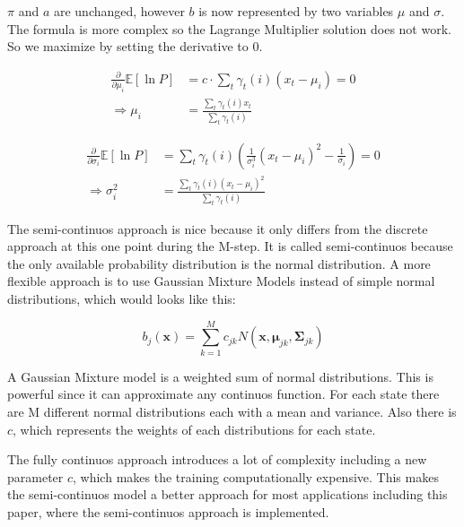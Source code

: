 $\pi$ and $a$ are unchanged, however $b$ is now represented by two variables $\mu$ and $\sigma$. The formula is more complex so the Lagrange Multiplier solution does not work. So we maximize by setting the derivative to 0. 

\begin{equation}
\begin{aligned}
\frac{\partial}{\partial \mu_i} \mathbb{E}[\ln P] &= c \cdot \sum_t \gamma_t(i) (x_t - \mu_i) = 0 \\
\Rightarrow \mu_i &= \frac{\sum_t \gamma_t(i)x_t}{\sum_t \gamma_t(i)}
\end{aligned}
\label{eq:mu-def}
\end{equation}

\begin{equation}
\begin{aligned}
\frac{\partial}{\partial \sigma_i} \mathbb{E}[\ln P] &= \sum_t \gamma_t(i) (\frac{1}{\sigma_i^3}(x_t-\mu_i)^2 - \frac{1}{\sigma_i}) = 0 \\
\Rightarrow \sigma_i^2 &= \frac{\sum_t \gamma_t(i)(x_t - \mu_i)^2}{\sum_t \gamma_t(i)}
\end{aligned}
\label{eq:sigma-def}
\end{equation}

The semi-continuos approach is nice because it only differs from the discrete approach at this one point during the M-step. It is called semi-continuos because the only available probability distribution is the normal distribution. A more flexible approach is to use Gaussian Mixture Models instead of simple normal distributions, which would looks like this: 

\begin{equation}
  b_{j}(\mathbf{x})=\sum_{k=1}^{M} c_{j k} N\left(\mathbf{x}, \boldsymbol{\mu}_{j k}, \boldsymbol{\Sigma}_{j k}\right) 
\end{equation}

A Gaussian Mixture model is a weighted sum of normal distributions. This is powerful since it can approximate any continuos function. For each state there are M different normal distributions each with a mean and variance. Also there is $c$, which represents the weights of each distributions for each state. 

The fully continuos approach introduces a lot of complexity including a new parameter $c$, which makes the training computationally expensive. This makes the semi-continuos model a better approach for most applications including this paper, where the semi-continuos approach is implemented. 
